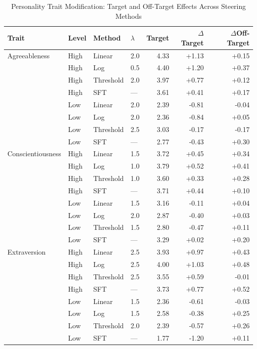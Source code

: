 \begin{table}[htbp]
\begin{threeparttable}
\caption{Personality Trait Modification: Target and Off-Target Effects Across Steering Methods}
\label{tab:trait_effects}
\centering
\small
\begin{tabular}{llllrrr}
\toprule
Trait & Level & Method & $\lambda$ & Target & $\Delta$Target & $\Delta$Off-Target \\
\midrule
  Agreeableness & High & Linear & 2.0 & 4.33 & +1.13 & +0.15 \\
   & High & Log & 0.5 & 4.40 & +1.20 & +0.37 \\
   & High & Threshold & 2.0 & 3.97 & +0.77 & +0.12 \\
   & High & SFT & — & 3.61 & +0.41 & +0.17 \\
   & Low & Linear & 2.0 & 2.39 & -0.81 & -0.04 \\
   & Low & Log & 2.0 & 2.36 & -0.84 & +0.05 \\
   & Low & Threshold & 2.5 & 3.03 & -0.17 & -0.17 \\
   & Low & SFT & — & 2.77 & -0.43 & +0.30 \\
\addlinespace
  Conscientiousness & High & Linear & 1.5 & 3.72 & +0.45 & +0.34 \\
   & High & Log & 1.0 & 3.79 & +0.52 & +0.41 \\
   & High & Threshold & 1.0 & 3.60 & +0.33 & +0.28 \\
   & High & SFT & — & 3.71 & +0.44 & +0.10 \\
   & Low & Linear & 1.5 & 3.16 & -0.11 & +0.04 \\
   & Low & Log & 2.0 & 2.87 & -0.40 & +0.03 \\
   & Low & Threshold & 1.5 & 2.80 & -0.47 & +0.11 \\
   & Low & SFT & — & 3.29 & +0.02 & +0.20 \\
\addlinespace
  Extraversion & High & Linear & 2.5 & 3.93 & +0.97 & +0.43 \\
   & High & Log & 2.5 & 4.00 & +1.03 & +0.48 \\
   & High & Threshold & 2.5 & 3.55 & +0.59 & -0.01 \\
   & High & SFT & — & 3.73 & +0.77 & +0.52 \\
   & Low & Linear & 1.5 & 2.36 & -0.61 & -0.03 \\
   & Low & Log & 1.5 & 2.58 & -0.38 & +0.25 \\
   & Low & Threshold & 2.0 & 2.39 & -0.57 & +0.26 \\
   & Low & SFT & — & 1.77 & -1.20 & +0.11 \\

\end{tabular}
\end{threeparttable}
\end{table}
